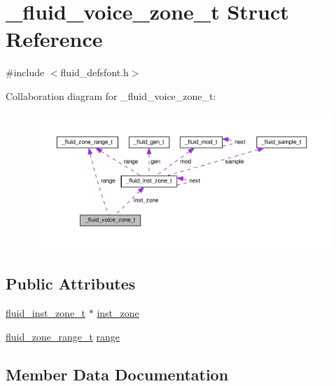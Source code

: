 \hypertarget{struct__fluid__voice__zone__t}{}\section{\+\_\+fluid\+\_\+voice\+\_\+zone\+\_\+t Struct Reference}
\label{struct__fluid__voice__zone__t}


{\ttfamily \#include $<$fluid\+\_\+defsfont.\+h$>$}



Collaboration diagram for \+\_\+fluid\+\_\+voice\+\_\+zone\+\_\+t\+:
\nopagebreak
\begin{figure}[H]
\begin{center}
\leavevmode
\includegraphics[width=350pt]{struct__fluid__voice__zone__t__coll__graph}
\end{center}
\end{figure}
\subsection*{Public Attributes}
\begin{DoxyCompactItemize}
\item 
\hyperlink{fluid__defsfont_8h_aa02ac18b4c58545cc3b297bdf4d933ab}{fluid\+\_\+inst\+\_\+zone\+\_\+t} $\ast$ \hyperlink{struct__fluid__voice__zone__t_a9ea94f8aa6d376c55c942b6e11f1acbc}{inst\+\_\+zone}
\item 
\hyperlink{fluidsynth__priv_8h_ac8502f0049ba8c20821b136e611462da}{fluid\+\_\+zone\+\_\+range\+\_\+t} \hyperlink{struct__fluid__voice__zone__t_aa4ab9b1dcdb5c972cb37458478ec2fe6}{range}
\end{DoxyCompactItemize}


\subsection{Member Data Documentation}
\mbox{\label{struct__fluid__voice__zone__t_a9ea94f8aa6d376c55c942b6e11f1acbc}} 
